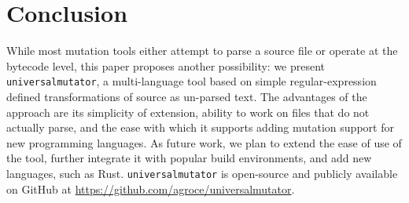 \section{Conclusion}

While most mutation tools either attempt to parse a source file or
operate at the bytecode level, this paper proposes another
possibility:  we present {\tt universalmutator}, a multi-language tool based on simple regular-expression
defined transformations of source as un-parsed text.  The advantages
of the approach are its simplicity of extension, ability to work on files that do
not actually parse, and the ease with which it supports adding
mutation support for new programming languages.  As future work, we plan to extend the ease of use of the tool, further integrate it with popular build environments, and add new languages, such as Rust.
{\tt universalmutator} is open-source and publicly available on GitHub at \url{https://github.com/agroce/universalmutator}.

